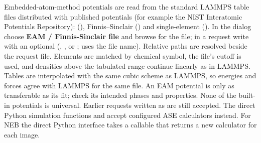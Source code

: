 Embedded-atom-method potentials are read from the standard LAMMPS table files distributed with published potentials (for example the NIST Interatomic Potentials Repository):  (), Finnis--Sinclair () and single-element  (). In the dialog choose \textbf{EAM / Finnis-Sinclair file} and browse for the file; in a request write  with an optional  (, ,  or ;  uses the file name). Relative paths are resolved beside the request file. Elements are matched by chemical symbol, the file's cutoff is used, and densities above the tabulated range continue linearly as in LAMMPS. Tables are interpolated with the same cubic scheme as LAMMPS, so energies and forces agree with LAMMPS for the same file. An EAM potential is only as transferable as its fit; check its intended phases and properties. None of the built-in potentials is universal. Earlier requests written as  are still accepted. The direct Python simulation functions and  accept configured ASE calculators instead. For NEB the direct Python interface takes a callable that returns a new calculator for each image.

